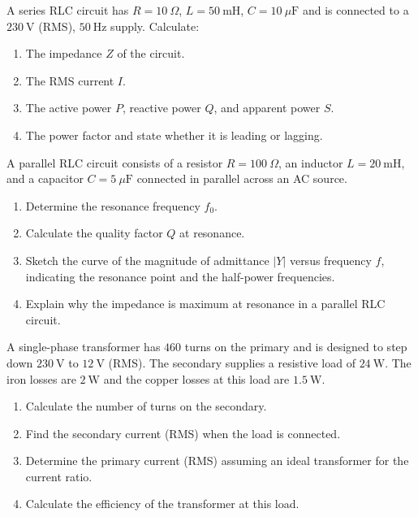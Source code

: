 \documentclass[11pt]{article}
\newcounter{popsec}
\newcounter{popsub}
\newcommand{\courssub}[1]{%
  \stepcounter{popsub}%
  \par\vspace{9pt}\noindent{\popxbold\fontsize{11.5}{13}\selectfont\color{popink}{\color{poporange}\thepopsec.\thepopsub}\hspace{6pt}#1}\par\nopagebreak\vspace{4pt}
}
\begin{document}
\courssub{I practise}

\begin{exercice}
A series RLC circuit has $R=10\ \Omega$, $L=50\ \mathrm{mH}$, $C=10\ \mu\mathrm{F}$ and is connected to a $230\ \mathrm{V}$ (RMS), $50\ \mathrm{Hz}$ supply.
Calculate:
\begin{enumerate}
\item The impedance $Z$ of the circuit.
\item The RMS current $I$.
\item The active power $P$, reactive power $Q$, and apparent power $S$.
\item The power factor and state whether it is leading or lagging.
\end{enumerate}
\end{exercice}

\begin{exercice}
A parallel RLC circuit consists of a resistor $R=100\ \Omega$, an inductor $L=20\ \mathrm{mH}$, and a capacitor $C=5\ \mu\mathrm{F}$ connected in parallel across an AC source.
\begin{enumerate}
\item Determine the resonance frequency $f_0$.
\item Calculate the quality factor $Q$ at resonance.
\item Sketch the curve of the magnitude of admittance $|Y|$ versus frequency $f$, indicating the resonance point and the half-power frequencies.
\item Explain why the impedance is maximum at resonance in a parallel RLC circuit.
\end{enumerate}
\end{exercice}

\begin{exercice}
A single-phase transformer has $460$ turns on the primary and is designed to step down $230\ \mathrm{V}$ to $12\ \mathrm{V}$ (RMS). The secondary supplies a resistive load of $24\ \mathrm{W}$. The iron losses are $2\ \mathrm{W}$ and the copper losses at this load are $1.5\ \mathrm{W}$.
\begin{enumerate}
\item Calculate the number of turns on the secondary.
\item Find the secondary current (RMS) when the load is connected.
\item Determine the primary current (RMS) assuming an ideal transformer for the current ratio.
\item Calculate the efficiency of the transformer at this load.
\end{enumerate}
\end{exercice}
\end{document}
